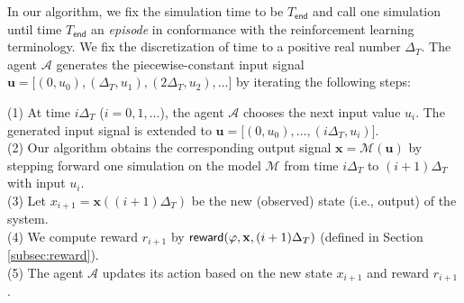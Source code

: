 In our algorithm,
we fix the simulation time to be $T_{\mathsf{end}}$
and
call one simulation until time $T_\mathsf{end}$
an \emph{episode} in conformance with the reinforcement learning terminology.
We fix the discretization of time to a positive real number $\Delta_T$.
The agent $\mathcal{A}$ generates the piecewise-constant input signal
$\mathbf{u} = \big[(0, u_0), (\Delta_T, u_{1}), (2\Delta_T, u_{2}), \dots \big]$
by iterating the following steps:


(1) At time $i \Delta_T$ ($i=0,1,\dots$),
  the agent $\mathcal{A}$ chooses the next input value $u_i$.
  The generated input signal is extended to
  $\mathbf{u} = \big[(0, u_0), \dots, (i\Delta_T, u_i) \big]$. \\
\indent (2) Our algorithm obtains the corresponding output signal $\mathbf{x} = \mathcal{M}(\mathbf{u})$
  by stepping forward one simulation on the model $\mathcal{M}$
  from time $i \Delta_T$ to $(i+1) \Delta_T$ with input $u_{i}$. \\
\indent (3) Let $x_{i+1} = \mathbf{x}((i+1)\Delta_T)$ be the new (observed) state (i.e., output) of the system. \\
\indent (4) We compute reward $r_{i+1}$ by $\operatorname{\mathsf{reward}}(\varphi, \mathbf{x}, (i+1)\Delta_T)$ (defined in Section \ref{subsec:reward}). \\
\indent (5) The agent $\mathcal{A}$ updates its action based on the new state $x_{i+1}$ and reward $r_{i+1}$.

